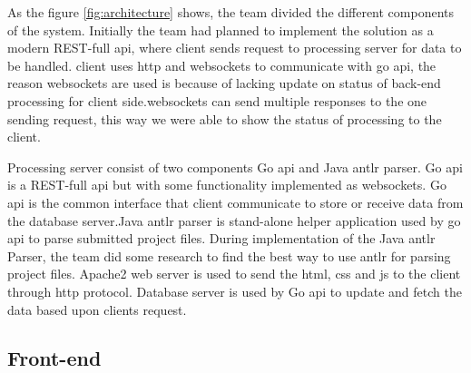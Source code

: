 As the figure \ref{fig:architecture} shows, the team divided the different components of the system. Initially the team had planned to implement the solution as a modern REST-full \gls{api}, where \gls{client} sends request to processing server for data to be handled. \Gls{client} uses \gls{http} and \glspl{websocket} to communicate with go \gls{api}, the reason \glspl{websocket} are used is because of lacking update on status of back-end processing for \gls{client} side.\glspl{websocket} can send multiple responses to the one sending request, this way we were able to show the status of processing to the \gls{client}.

Processing server consist of two components Go \gls{api} and Java antlr parser. Go \gls{api} is a REST-full \gls{api} but with some functionality implemented as \glspl{websocket}. Go \gls{api} is the common interface that \gls{client} communicate to store or receive data from the database server.Java \gls{antlr} parser is stand-alone helper application used by go \gls{api} to parse submitted project files. During implementation of the Java \gls{antlr} Parser, the team did some research to find the best way to use \gls{antlr} for parsing project files. Apache2 web server is used to send the \gls{html}, \gls{css} and \gls{js} to the \gls{client} through \gls{http} protocol. Database server is used by Go \gls{api} to update and fetch the data based upon \glspl{client} request.

\subsection{Front-end}



